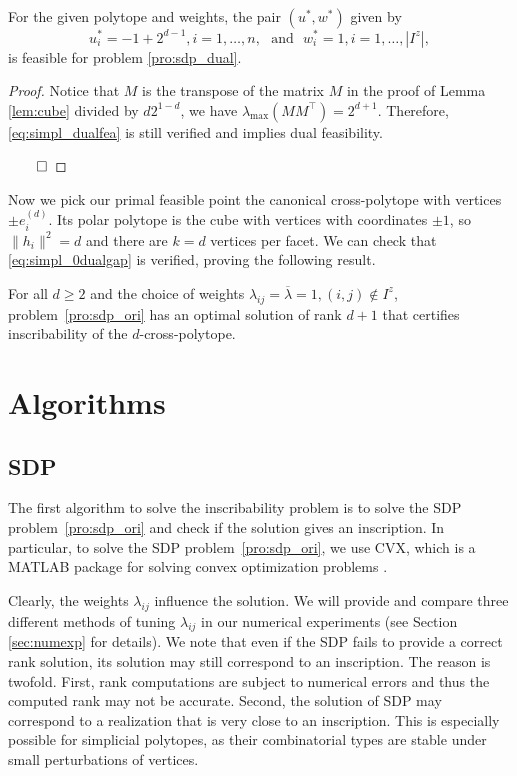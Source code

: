 \documentclass[smallextended, envcountsame]{svjour3}
\begin{document}
    \begin{lemma}
        For the given polytope and weights, the pair $(u^*,w^*)$ given by
        \begin{equation*}
            u_i^* = -1 + 2^{d-1}, i=1,\ldots,n,~~~\text{and}~~~w_i^* = 1, i=1,\ldots,\left|I^z\right|,	
    	\end{equation*}
        is feasible for problem \eqref{pro:sdp_dual}.
    \end{lemma}
    \begin{proof}
        Notice that $M$ is the transpose of the matrix $M$ in the proof of Lemma \ref{lem:cube} divided by $d2^{1-d}$, we have $\lambda_{\max}(MM^\top)=2^{d+1}$.  Therefore, \eqref{eq:simpl_dualfea} is still verified and implies dual feasibility.

    $\hfill\qed$
    \end{proof}
    
    Now we pick our primal feasible point the canonical cross-polytope with vertices $\pm e_i^{(d)}$.  Its polar polytope is the cube with vertices with coordinates $\pm 1$, so $\|h_i\|^2=d$ and there are $k=d$ vertices per facet.  We can check that \eqref{eq:simpl_0dualgap} is verified, proving the following result.  
    \begin{theorem}
        For all $d \ge 2$ and the choice of weights $\lambda_{ij} =  \overline{\lambda}= 1, (i,j)\notin I^z$, problem~\eqref{pro:sdp_ori} has an optimal solution of rank $d+1$ that certifies inscribability of the $d$-cross-polytope.
    \end{theorem}



\section{Algorithms}\label{sec:algs}
\subsection{SDP}
    The first algorithm to solve the inscribability problem is to solve the SDP problem~\eqref{pro:sdp_ori} and check if the solution gives an inscription.  In particular, to solve the SDP problem~\eqref{pro:sdp_ori}, we use CVX, which is a MATLAB package for solving convex optimization problems \cite{grant2008graph,grant2014cvx}.
    
    Clearly, the weights $\lambda_{ij}$ influence the solution.  We will provide and compare three different methods of tuning $\lambda_{ij}$ in our numerical experiments (see Section \ref{sec:numexp} for details).  We note that even if the SDP fails to provide a correct rank solution, its solution may still correspond to an inscription.  The reason is twofold.  First, rank computations are subject to numerical errors and thus the computed rank may not be accurate.  Second, the solution of SDP may correspond to a realization that is very close to an inscription.  This is especially possible for simplicial polytopes, as their combinatorial types are stable under small perturbations of vertices.
\end{document}
